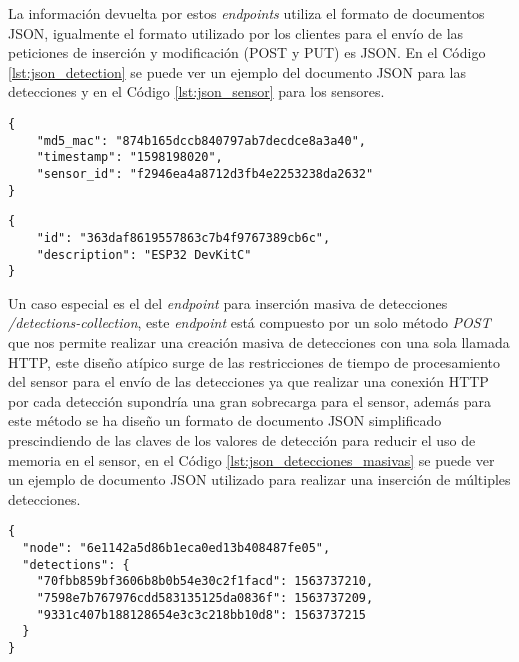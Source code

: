 \documentclass[../proyecto.tex]{subfiles}
\begin{document}
La información devuelta por estos \textit{endpoints} utiliza el formato de documentos JSON, igualmente el formato utilizado por los clientes para el envío de las peticiones de inserción y modificación (POST y PUT) es JSON. En el Código \ref{lst:json_detection} se puede ver un ejemplo del documento JSON para las detecciones y en el Código \ref{lst:json_sensor} para los sensores.\\

\begin{minipage}{\linewidth}
\begin{lstlisting}[caption=Ejemplo de JSON para detecciones, label={lst:json_detection}, captionpos=b, frame=single]
{
    "md5_mac": "874b165dccb840797ab7decdce8a3a40",
    "timestamp": "1598198020",
    "sensor_id": "f2946ea4a8712d3fb4e2253238da2632"
}
\end{lstlisting}
\end{minipage}

\begin{minipage}{\linewidth}
\begin{lstlisting}[caption=Ejemplo de JSON para sensores, label={lst:json_sensor}, captionpos=b, frame=single]
{
    "id": "363daf8619557863c7b4f9767389cb6c",
    "description": "ESP32 DevKitC"
}
\end{lstlisting}
\end{minipage}

Un caso especial es el del \textit{endpoint} para inserción masiva de detecciones \textit{/detections-collection}, este \textit{endpoint} está compuesto por un solo método \textit{POST} que nos permite realizar una creación masiva de detecciones con una sola llamada HTTP, este diseño atípico surge de las restricciones de tiempo de procesamiento del sensor para el envío de las detecciones ya que realizar una conexión HTTP por cada detección supondría una gran sobrecarga para el sensor, además para este método se ha diseño un formato de documento JSON simplificado prescindiendo de las claves de los valores de detección para reducir el uso de memoria en el sensor, en el Código \ref{lst:json_detecciones_masivas} se puede ver un ejemplo de documento JSON utilizado para realizar una inserción de múltiples detecciones.\\

\begin{minipage}{\linewidth}
\begin{lstlisting}[caption=Ejemplo de JSON para inserción masiva de detecciones, label={lst:json_detecciones_masivas},captionpos=b, frame=single]
{
  "node": "6e1142a5d86b1eca0ed13b408487fe05",
  "detections": {
    "70fbb859bf3606b8b0b54e30c2f1facd": 1563737210,
    "7598e7b767976cdd583135125da0836f": 1563737209,
    "9331c407b188128654e3c3c218bb10d8": 1563737215
  }
}
\end{lstlisting}
\end{minipage}
\end{document}
